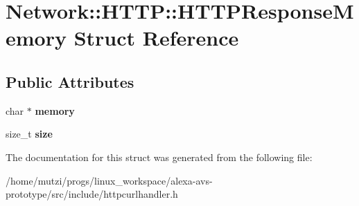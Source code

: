\hypertarget{structNetwork_1_1HTTP_1_1HTTPResponseMemory}{}\section{Network\+:\+:H\+T\+TP\+:\+:H\+T\+T\+P\+Response\+Memory Struct Reference}
\label{structNetwork_1_1HTTP_1_1HTTPResponseMemory}
\subsection*{Public Attributes}
\begin{DoxyCompactItemize}
\item 
\mbox{\label{structNetwork_1_1HTTP_1_1HTTPResponseMemory_a251ce9ea73281ad889d5632ae24ee186}} 
char $\ast$ {\bfseries memory}
\item 
\mbox{\label{structNetwork_1_1HTTP_1_1HTTPResponseMemory_af3e7e51cb9581910665d7590fcee86b0}} 
size\+\_\+t {\bfseries size}
\end{DoxyCompactItemize}


The documentation for this struct was generated from the following file\+:\begin{DoxyCompactItemize}
\item 
/home/mutzi/progs/linux\+\_\+workspace/alexa-\/avs-\/prototype/src/include/httpcurlhandler.\+h\end{DoxyCompactItemize}
